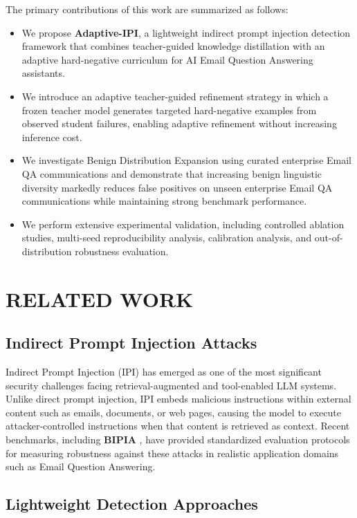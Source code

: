 \documentclass[conference]{IEEEtran}
\begin{document}
The primary contributions of this work are summarized as follows:
\begin{itemize}
    \item We propose \textbf{Adaptive-IPI}, a lightweight indirect prompt injection detection framework that combines teacher-guided knowledge distillation with an adaptive hard-negative curriculum for AI Email Question Answering assistants.
    \item We introduce an adaptive teacher-guided refinement strategy in which a frozen teacher model generates targeted hard-negative examples from observed student failures, enabling adaptive refinement without increasing inference cost.
    \item We investigate Benign Distribution Expansion using curated enterprise Email QA communications and demonstrate that increasing benign linguistic diversity markedly reduces false positives on unseen enterprise Email QA communications while maintaining strong benchmark performance.
    \item We perform extensive experimental validation, including controlled ablation studies, multi-seed reproducibility analysis, calibration analysis, and out-of-distribution robustness evaluation.
\end{itemize}

\section{RELATED WORK}

\subsection{Indirect Prompt Injection Attacks}

Indirect Prompt Injection (IPI) has emerged as one of the most significant security challenges
facing retrieval-augmented and tool-enabled LLM systems. Unlike direct prompt injection, IPI embeds
malicious instructions within external content such as emails, documents, or web pages, causing the
model to execute attacker-controlled instructions when that content is retrieved as context. Recent
benchmarks, including \textbf{BIPIA} \cite{ref8}, have provided standardized evaluation protocols
for measuring robustness against these attacks in realistic application domains such as Email
Question Answering.

\subsection{Lightweight Detection Approaches}
\end{document}
